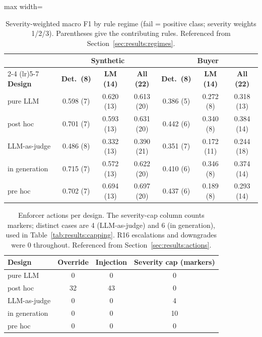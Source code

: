 \begin{table}[htbp]
\centering
\caption{Severity-weighted macro F1 by rule regime (fail = positive class; severity weights 1/2/3). Parentheses give the contributing rules. Referenced from Section~\ref{sec:results:regimes}.}
\label{tab:results:fwslices}
\footnotesize
\begin{adjustbox}{max width=\textwidth}
\begin{tabular}{@{}lcccccc@{}}
\toprule
& \multicolumn{3}{c}{\textbf{Synthetic}} & \multicolumn{3}{c}{\textbf{Buyer}} \\
\cmidrule(lr){2-4} \cmidrule(lr){5-7}
\textbf{Design} & \textbf{Det.\ (8)} & \textbf{LM (14)} & \textbf{All (22)} & \textbf{Det.\ (8)} & \textbf{LM (14)} & \textbf{All (22)} \\
\midrule
pure LLM      & 0.598 (7) & 0.620 (13) & 0.613 (20) & 0.386 (5) & 0.272 (8)  & 0.318 (13) \\
post hoc      & 0.701 (7) & 0.593 (13) & 0.631 (20) & 0.442 (6) & 0.340 (8)  & 0.384 (14) \\
LLM-as-judge  & 0.486 (8) & 0.332 (13) & 0.390 (21) & 0.351 (7) & 0.172 (11) & 0.244 (18) \\
in generation & 0.715 (7) & 0.572 (13) & 0.622 (20) & 0.410 (6) & 0.346 (8)  & 0.374 (14) \\
pre hoc       & 0.702 (7) & 0.694 (13) & 0.697 (20) & 0.437 (6) & 0.189 (8)  & 0.293 (14) \\
\bottomrule
\end{tabular}
\end{adjustbox}
\end{table}

\begin{table}[htbp]
\centering
\caption{Enforcer actions per design. The severity-cap column counts markers; distinct cases are 4 (LLM-as-judge) and 6 (in generation), used in Table~\ref{tab:results:capping}. R16 escalations and downgrades were 0 throughout. Referenced from Section~\ref{sec:results:actions}.}
\label{tab:results:actions}
\footnotesize
\begin{tabular}{@{}lccc@{}}
\toprule
\textbf{Design} & \textbf{Override} & \textbf{Injection} & \textbf{Severity cap (markers)} \\
\midrule
pure LLM      & 0  & 0  & 0  \\
post hoc      & 32 & 43 & 0  \\
LLM-as-judge  & 0  & 0  & 4  \\
in generation & 0  & 0  & 10 \\
pre hoc       & 0  & 0  & 0  \\
\bottomrule
\end{tabular}
\end{table}

